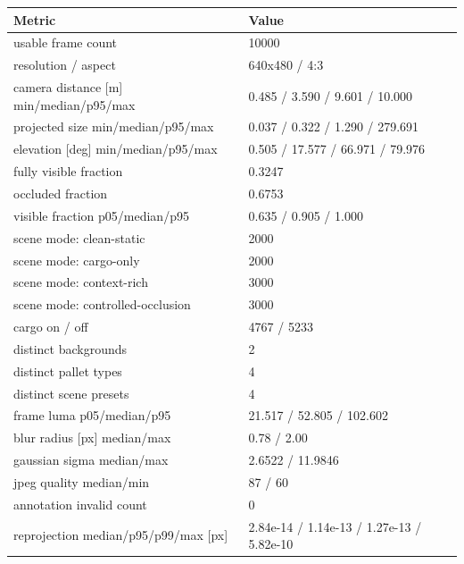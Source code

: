 \begin{tabular}{ll}
\toprule
Metric & Value \\
\midrule
usable frame count & 10000 \\
resolution / aspect & 640x480 / 4:3 \\
camera distance [m] min/median/p95/max & 0.485 / 3.590 / 9.601 / 10.000 \\
projected size min/median/p95/max & 0.037 / 0.322 / 1.290 / 279.691 \\
elevation [deg] min/median/p95/max & 0.505 / 17.577 / 66.971 / 79.976 \\
fully visible fraction & 0.3247 \\
occluded fraction & 0.6753 \\
visible fraction p05/median/p95 & 0.635 / 0.905 / 1.000 \\
scene mode: clean-static & 2000 \\
scene mode: cargo-only & 2000 \\
scene mode: context-rich & 3000 \\
scene mode: controlled-occlusion & 3000 \\
cargo on / off & 4767 / 5233 \\
distinct backgrounds & 2 \\
distinct pallet types & 4 \\
distinct scene presets & 4 \\
frame luma p05/median/p95 & 21.517 / 52.805 / 102.602 \\
blur radius [px] median/max & 0.78 / 2.00 \\
gaussian sigma median/max & 2.6522 / 11.9846 \\
jpeg quality median/min & 87 / 60 \\
annotation invalid count & 0 \\
reprojection median/p95/p99/max [px] & 2.84e-14 / 1.14e-13 / 1.27e-13 / 5.82e-10 \\
\bottomrule
\end{tabular}
